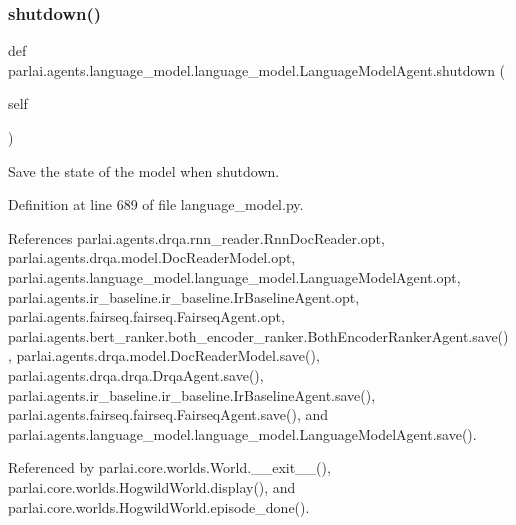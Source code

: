 \mbox{\label{classparlai_1_1agents_1_1language__model_1_1language__model_1_1LanguageModelAgent_ab7b37ff49b1ce04ef7ce0e598cf736e3}} 
\subsubsection{\texorpdfstring{shutdown()}{shutdown()}}
{\footnotesize\ttfamily def parlai.\+agents.\+language\+\_\+model.\+language\+\_\+model.\+Language\+Model\+Agent.\+shutdown (\begin{DoxyParamCaption}\item[{}]{self }\end{DoxyParamCaption})}

\begin{DoxyVerb}Save the state of the model when shutdown.\end{DoxyVerb}
 

Definition at line 689 of file language\+\_\+model.\+py.



References parlai.\+agents.\+drqa.\+rnn\+\_\+reader.\+Rnn\+Doc\+Reader.\+opt, parlai.\+agents.\+drqa.\+model.\+Doc\+Reader\+Model.\+opt, parlai.\+agents.\+language\+\_\+model.\+language\+\_\+model.\+Language\+Model\+Agent.\+opt, parlai.\+agents.\+ir\+\_\+baseline.\+ir\+\_\+baseline.\+Ir\+Baseline\+Agent.\+opt, parlai.\+agents.\+fairseq.\+fairseq.\+Fairseq\+Agent.\+opt, parlai.\+agents.\+bert\+\_\+ranker.\+both\+\_\+encoder\+\_\+ranker.\+Both\+Encoder\+Ranker\+Agent.\+save(), parlai.\+agents.\+drqa.\+model.\+Doc\+Reader\+Model.\+save(), parlai.\+agents.\+drqa.\+drqa.\+Drqa\+Agent.\+save(), parlai.\+agents.\+ir\+\_\+baseline.\+ir\+\_\+baseline.\+Ir\+Baseline\+Agent.\+save(), parlai.\+agents.\+fairseq.\+fairseq.\+Fairseq\+Agent.\+save(), and parlai.\+agents.\+language\+\_\+model.\+language\+\_\+model.\+Language\+Model\+Agent.\+save().



Referenced by parlai.\+core.\+worlds.\+World.\+\_\+\+\_\+exit\+\_\+\+\_\+(), parlai.\+core.\+worlds.\+Hogwild\+World.\+display(), and parlai.\+core.\+worlds.\+Hogwild\+World.\+episode\+\_\+done().

